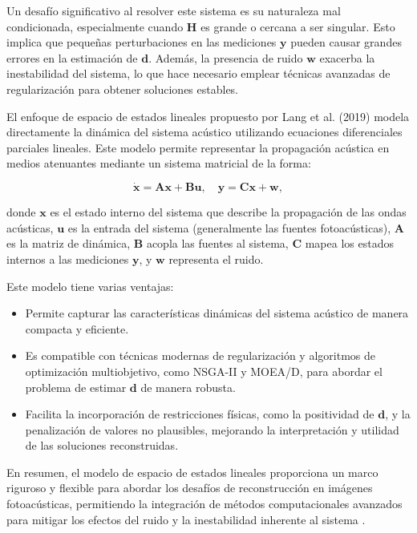 Un desafío significativo al resolver este sistema es su naturaleza mal condicionada, especialmente cuando $\mathbf{H}$ es grande o cercana a ser singular. Esto implica que pequeñas perturbaciones en las mediciones $\mathbf{y}$ pueden causar grandes errores en la estimación de $\mathbf{d}$. Además, la presencia de ruido $\mathbf{w}$ exacerba la inestabilidad del sistema, lo que hace necesario emplear técnicas avanzadas de regularización para obtener soluciones estables.

El enfoque de espacio de estados lineales propuesto por Lang et al. (2019) modela directamente la dinámica del sistema acústico utilizando ecuaciones diferenciales parciales lineales. Este modelo permite representar la propagación acústica en medios atenuantes mediante un sistema matricial de la forma:

\begin{equation} \dot{\mathbf{x}} = \mathbf{A} \mathbf{x} + \mathbf{B} \mathbf{u}, \quad \mathbf{y} = \mathbf{C} \mathbf{x} + \mathbf{w}, \end{equation}

donde $\mathbf{x}$ es el estado interno del sistema que describe la propagación de las ondas acústicas, $\mathbf{u}$ es la entrada del sistema (generalmente las fuentes fotoacústicas), $\mathbf{A}$ es la matriz de dinámica, $\mathbf{B}$ acopla las fuentes al sistema, $\mathbf{C}$ mapea los estados internos a las mediciones $\mathbf{y}$, y $\mathbf{w}$ representa el ruido.

Este modelo tiene varias ventajas: \begin{itemize} \item Permite capturar las características dinámicas del sistema acústico de manera compacta y eficiente. \item Es compatible con técnicas modernas de regularización y algoritmos de optimización multiobjetivo, como NSGA-II y MOEA/D, para abordar el problema de estimar $\mathbf{d}$ de manera robusta. \item Facilita la incorporación de restricciones físicas, como la positividad de $\mathbf{d}$, y la penalización de valores no plausibles, mejorando la interpretación y utilidad de las soluciones reconstruidas. \end{itemize}

En resumen, el modelo de espacio de estados lineales proporciona un marco riguroso y flexible para abordar los desafíos de reconstrucción en imágenes fotoacústicas, permitiendo la integración de métodos computacionales avanzados para mitigar los efectos del ruido y la inestabilidad inherente al sistema \cite{Lang2019}.

